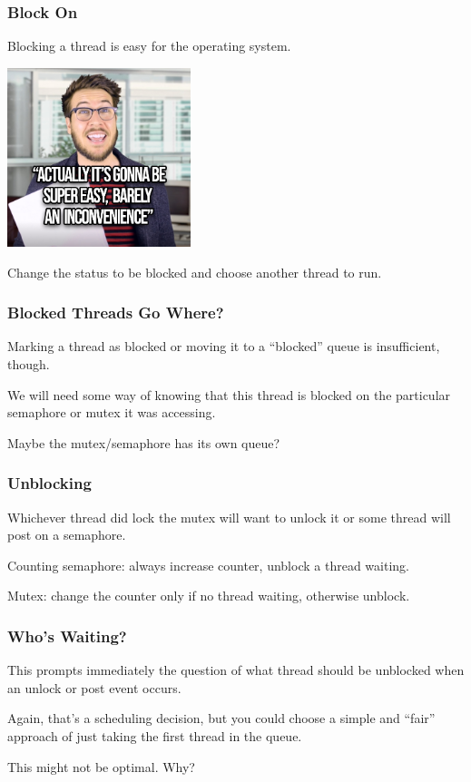 \begin{frame}
\frametitle{Block On}

Blocking a thread is easy for the operating system.

\begin{center}
	\includegraphics[width=0.4\textwidth]{images/supereasy.jpg}
\end{center}

Change the status to be blocked and choose another thread to run.

\end{frame}

\begin{frame}
\frametitle{Blocked Threads Go Where?}

Marking a thread as blocked or moving it to a ``blocked'' queue is insufficient, though.

We will need some way of knowing that this thread is blocked on the particular semaphore or mutex it was accessing.

Maybe the mutex/semaphore has its own queue?

\end{frame}

\begin{frame}
\frametitle{Unblocking}

Whichever thread did lock the mutex will want to unlock it or some thread will post on a semaphore.

Counting semaphore: always increase counter, unblock a thread waiting.

Mutex: change the counter only if no thread waiting, otherwise unblock.

\end{frame}

\begin{frame}
\frametitle{Who's Waiting?}

This prompts immediately the question of what thread should be unblocked when an unlock or post event occurs. 

Again, that's a scheduling decision, but you could choose a simple and ``fair'' approach of just taking the first thread in the queue. 

This might not be optimal. Why?

\end{frame}

